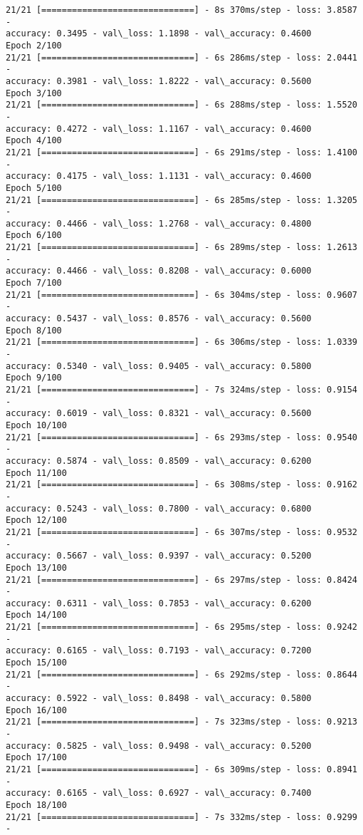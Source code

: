 \documentclass[11pt]{article}
\begin{document}
    \begin{Verbatim}[commandchars=\\\{\}]
21/21 [==============================] - 8s 370ms/step - loss: 3.8587 -
accuracy: 0.3495 - val\_loss: 1.1898 - val\_accuracy: 0.4600
Epoch 2/100
21/21 [==============================] - 6s 286ms/step - loss: 2.0441 -
accuracy: 0.3981 - val\_loss: 1.8222 - val\_accuracy: 0.5600
Epoch 3/100
21/21 [==============================] - 6s 288ms/step - loss: 1.5520 -
accuracy: 0.4272 - val\_loss: 1.1167 - val\_accuracy: 0.4600
Epoch 4/100
21/21 [==============================] - 6s 291ms/step - loss: 1.4100 -
accuracy: 0.4175 - val\_loss: 1.1131 - val\_accuracy: 0.4600
Epoch 5/100
21/21 [==============================] - 6s 285ms/step - loss: 1.3205 -
accuracy: 0.4466 - val\_loss: 1.2768 - val\_accuracy: 0.4800
Epoch 6/100
21/21 [==============================] - 6s 289ms/step - loss: 1.2613 -
accuracy: 0.4466 - val\_loss: 0.8208 - val\_accuracy: 0.6000
Epoch 7/100
21/21 [==============================] - 6s 304ms/step - loss: 0.9607 -
accuracy: 0.5437 - val\_loss: 0.8576 - val\_accuracy: 0.5600
Epoch 8/100
21/21 [==============================] - 6s 306ms/step - loss: 1.0339 -
accuracy: 0.5340 - val\_loss: 0.9405 - val\_accuracy: 0.5800
Epoch 9/100
21/21 [==============================] - 7s 324ms/step - loss: 0.9154 -
accuracy: 0.6019 - val\_loss: 0.8321 - val\_accuracy: 0.5600
Epoch 10/100
21/21 [==============================] - 6s 293ms/step - loss: 0.9540 -
accuracy: 0.5874 - val\_loss: 0.8509 - val\_accuracy: 0.6200
Epoch 11/100
21/21 [==============================] - 6s 308ms/step - loss: 0.9162 -
accuracy: 0.5243 - val\_loss: 0.7800 - val\_accuracy: 0.6800
Epoch 12/100
21/21 [==============================] - 6s 307ms/step - loss: 0.9532 -
accuracy: 0.5667 - val\_loss: 0.9397 - val\_accuracy: 0.5200
Epoch 13/100
21/21 [==============================] - 6s 297ms/step - loss: 0.8424 -
accuracy: 0.6311 - val\_loss: 0.7853 - val\_accuracy: 0.6200
Epoch 14/100
21/21 [==============================] - 6s 295ms/step - loss: 0.9242 -
accuracy: 0.6165 - val\_loss: 0.7193 - val\_accuracy: 0.7200
Epoch 15/100
21/21 [==============================] - 6s 292ms/step - loss: 0.8644 -
accuracy: 0.5922 - val\_loss: 0.8498 - val\_accuracy: 0.5800
Epoch 16/100
21/21 [==============================] - 7s 323ms/step - loss: 0.9213 -
accuracy: 0.5825 - val\_loss: 0.9498 - val\_accuracy: 0.5200
Epoch 17/100
21/21 [==============================] - 6s 309ms/step - loss: 0.8941 -
accuracy: 0.6165 - val\_loss: 0.6927 - val\_accuracy: 0.7400
Epoch 18/100
21/21 [==============================] - 7s 332ms/step - loss: 0.9299 -

\end{Verbatim}
\end{document}
